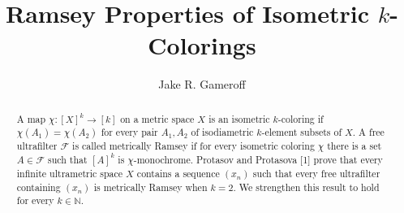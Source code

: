 
\makeatletter
\def\@settitle{\begin{center}%
  \baselineskip14\p@\relax
    \normalfont\Large%
\@title
  \end{center}%
}
\makeatother

\title{Ramsey Properties of Isometric $k$-Colorings}
\author{Jake R. Gameroff}

\begin{abstract}
	A map \( \chi : [X]^{k} \to [k] \) on a metric space \( X \) is an isometric \( k \)-coloring if \( \chi(A_1) = \chi(A_2) \) for every pair \( A_1,A_2 \) of isodiametric \( k \)-element subsets of \( X \). A free ultrafilter \( \mathcal{F}  \) is called metrically Ramsey if for every isometric coloring \( \chi \) there is a set \( A \in \mathcal{F}  \) such that \( [A]^{k}  \) is \( \chi \)-monochrome. Protasov and Protasova [1] prove that every infinite ultrametric space \( X \) contains a sequence \( (x_{n}) \) such that every free ultrafilter containing \( (x_{n}) \) is metrically Ramsey when \( k = 2 \). We strengthen this result to hold for every \( k \in \mathbb{N}  \).
\end{abstract}
\maketitle





